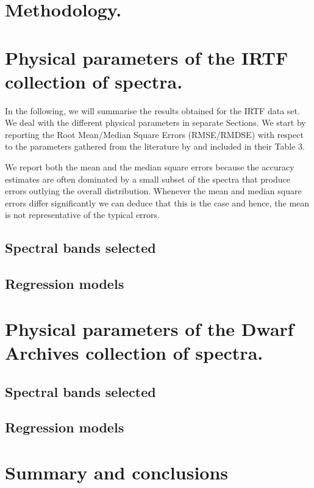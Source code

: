 \documentclass[a4paper,fleqn,usenatbib]{mnras}
\begin{document}
\section{Methodology.}
\label{sec:meth}


\section{Physical parameters of the IRTF collection of spectra.}
\label{sec:irtf}

In the following, we will summarise the results obtained for the IRTF
data set. We deal with the different physical parameters in separate
Sections. We start by reporting the Root Mean/Median Square Errors
(RMSE/RMDSE) with respect to the parameters gathered from the
literature by \cite{cesetti} and included in their Table 3.

We report both the mean and the median square errors because the
accuracy estimates are often dominated by a small subset of the
spectra that produce errors outlying the overall
distribution. Whenever the mean and median square errors differ
significantly we can deduce that this is the case and hence, the mean
is not representative of the typical errors.

\subsection{Spectral bands selected}

\subsection{Regression models}


\section{Physical parameters of the Dwarf Archives collection of spectra.}
\label{sec:ipac}

\subsection{Spectral bands selected}

\subsection{Regression models}


\section{Summary and conclusions}
\label{sec:summary}

\end{document}
